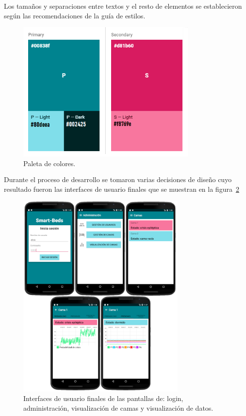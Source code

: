Los tamaños y separaciones entre textos y el resto de elementos se establecieron según las recomendaciones de la guía de estilos. 

\begin{figure}[H]
	\centering
	\includegraphics[width=0.8\textwidth]{../img/paletacolores.png}
	\caption{Paleta de colores.}
	\label{fig:paletacolores}
\end{figure}

Durante el proceso de desarrollo se tomaron varias decisiones de diseño cuyo resultado fueron las interfaces de usuario finales que se muestran en la figura~\ref{fig:interfaces}

\begin{figure}[H]
	\centering
	\includegraphics[width=0.75\textwidth]{../img/interfaces.png}
	\caption{Interfaces de usuario finales de las pantallas de: login, administración, visualización de camas y visualización de datos.}
	\label{fig:interfaces}
\end{figure}

